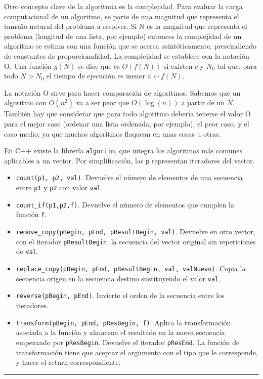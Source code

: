\documentclass[a4paper]{article}
\begin{document}
	Otro concepto clave de la algoritmia es la complejidad. Para evaluar la carga computacional de un algoritmo, se parte de una magnitud que representa el tamaño natural del problema a resolver. Si N es la magnitud que representa el problema (longitud de una lista, por ejemplo) entonces la complejidad de un algoritmo se estima con una función que se acerca asintóticamente, prescindiendo de constantes de proporcionalidad. La complejidad se establece con la notación O. Una función $g(N)$ se dice que es $O(f(N))$ si existen $c$ y $N_0$ tal que, para todo $N > N_0$ el tiempo de ejecución es menor a $c\cdot f(N)$.
	
	La notación O sirve para hacer comparación de algoritmos. Sabemos que un algoritmo con $O(n^2)$ va a ser peor que $O(\log(n))$ a partir de un $N$. También hay que considerar que para todo algoritmo debería tenerse el valor O para el mejor caso (ordenar una lista ordenada, por ejemplo), el peor caso, y el caso medio; ya que muchos algoritmos flaquean en unas cosas u otras.
	 
	
	En C++ existe la librería \verb|algoritm|, que integra los algoritmos más comunes aplicables a un vector. Por simplificación, las \verb|p| representan iteradores del vector.
	\begin{itemize}
		\item \verb|count(p1, p2, val)|. Devuelve el número de elementos de una secuencia entre \verb|p1| y \verb|p2| con valor \verb|val|.
		\item \verb|count_if(p1,p2,f)|. Devuelve el número de elementos que cumplen la función \verb|f|.
		\item \verb|remove_copy(pBegin, pEnd, pResultBegin, val)|. Devuelve en otro vector, con el iterador \verb|pResultBegin|, la secuencia del vector original sin repeticiones de \verb|val|.
		\item \verb|replace_copy(pBegin, pEnd, pResultBegin, val, valNuevo)|. Copia la secuencia origen en la secuencia destino sustituyendo el valor \verb|val|.
		\item \verb|reverse(pBegin, pEnd)|. Invierte el orden de la secuencia entre los iteradores.
		\item \verb|transform(pBegin, pEnd, pResBegin, f)|. Aplica la transformación asociada a la función y almacena el resultado en la nueva secuencia empezando por \verb|pResBegin|. Devuelve el iterador \verb|pResEnd|. La función de transformación tiene que aceptar el argumento con el tipo que le corresponde, y hacer el return correspondiente.
		
	\end{itemize}
	
	 
	 
	 \noindent\rule{\linewidth}{0.4pt}
	 \doclicenseThis
	 
	 
	 
	 
	 
	 
	 
	 
	  	
 	
 	
 	
 	
 	
\end{document}
